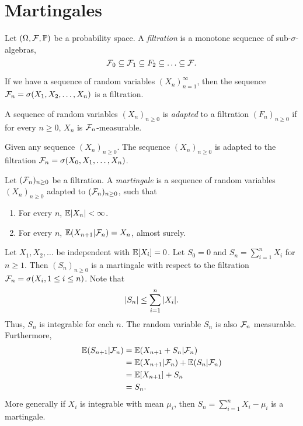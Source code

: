 \section{Martingales}
\begin{definition}
    Let $({{\Omega}},{\mathcal{F}},{\mathbb{P}})$ be a probability space. A \emph{filtration} is a monotone sequence of sub-$\sigma$-algebras,
    \[{\mathcal{F}}_0 \subseteq {\mathcal{F}}_1 \subseteq F_2 \subseteq \ldots \subseteq {\mathcal{F}}.\]
\end{definition}
\begin{example}
    If we have a sequence of random variables $(X_n)_{n=1}^\infty$, then the sequence ${\mathcal{F}}_n = \sigma(X_1,X_2,\ldots, X_n)$ is a filtration.
\end{example}
\begin{definition}
    A sequence of random variables $(X_n)_{n \ge 0}$ is \emph{adapted} to a filtration $(F_n)_{n \ge 0}$ if for every $n \ge 0$, $X_n$ is ${\mathcal{F}}_n$-measurable.
\end{definition}
\begin{example}
   Given any sequence $(X_n)_{n \ge 0}$. The sequence $(X_n)_{n \ge 0}$ is adapted to the filtration ${\mathcal{F}}_n = \sigma(X_0,X_1,\ldots,X_n)$. 
\end{example}
\begin{definition}
    Let $({\mathcal{F}}_n)_{n \ge 0}$ be a filtration. A \emph{martingale} is a sequence of random variables $(X_n)_{n \ge 0}$ adapted to $({\mathcal{F}}_n)_{n \ge 0}$, such that
    \begin{enumerate}
        \item For every $n$, ${\mathbb{E}}{\left\lvert X_n\right\rvert} < \infty$.
        \item For every $n$, ${\mathbb{E}}(X_{n+1}|{\mathcal{F}}_n) = X_n$, almost surely.
    \end{enumerate}
\end{definition}
\begin{example}
    Let $X_1,X_2,\ldots$ be independent with ${\mathbb{E}}[X_i]=0$. Let $S_0=0$ and $S_n = \sum_{i=1}^nX_i$ for $n \ge 1$. Then $(S_n)_{n \ge 0}$ is a martingale with respect to the filtration ${\mathcal{F}}_n = \sigma(X_i, 1\le i \le n)$. Note that 
    \[{\left\lvert S_n\right\rvert} \le \sum_{i=1}^n {\left\lvert X_i\right\rvert}. \]
    Thus, $S_n$ is integrable for each $n$. The random variable $S_n$ is also ${\mathcal{F}}_n$ measurable. Furthermore,
    \begin{align*}
        {\mathbb{E}}(S_{n+1}|{\mathcal{F}}_n) &={\mathbb{E}}(X_{n+1}+S_n|{\mathcal{F}}_n)\\
        &={\mathbb{E}}(X_{n+1}|{\mathcal{F}}_n)+{\mathbb{E}}(S_n|{\mathcal{F}}_n)\\
        &={\mathbb{E}}[X_{n+1}]+S_n\\
        &=S_n.
    \end{align*}
    More generally if $X_i$ is integrable with mean $\mu_i$, then $S_n = \sum_{i=1}^n X_i-\mu_i$ is a martingale.
\end{example}
